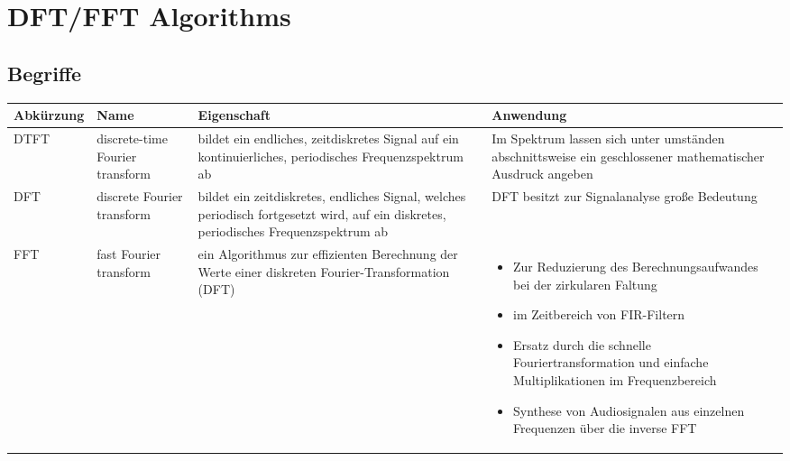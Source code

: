 \section{DFT/FFT Algorithms}
\subsection{Begriffe}

\begin{tabularx}{\textwidth}{l p{3cm}XX}
Abkürzung & Name  & Eigenschaft & Anwendung \\\hline
DTFT & discrete-time Fourier transform & bildet ein endliches, zeitdiskretes Signal auf ein kontinuierliches, periodisches Frequenzspektrum ab & Im Spektrum lassen sich unter umständen  abschnittsweise ein geschlossener mathematischer Ausdruck angeben\\
DFT & discrete Fourier transform & bildet ein zeitdiskretes, endliches Signal, welches periodisch fortgesetzt wird, auf ein diskretes, periodisches Frequenzspektrum ab & DFT besitzt zur Signalanalyse große Bedeutung\\
FFT & fast Fourier transform & ein Algorithmus zur effizienten Berechnung der Werte einer diskreten Fourier-Transformation (DFT) &
\vspace{-19pt}
\begin{itemize}
\item Zur Reduzierung des Berechnungsaufwandes bei der zirkularen Faltung
\item im Zeitbereich von FIR-Filtern
\item Ersatz durch die schnelle Fouriertransformation und einfache Multiplikationen im Frequenzbereich
\item Synthese von Audiosignalen aus einzelnen Frequenzen über die inverse FFT
\end{itemize}\\
\end{tabularx}

